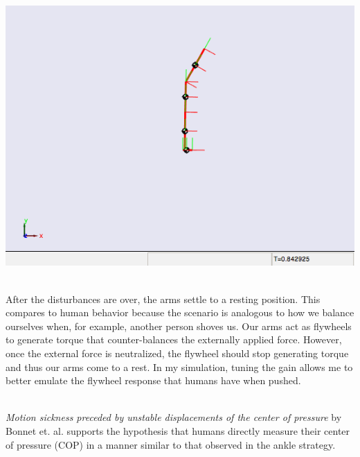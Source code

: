 \documentclass{article}
\newcommand{\questionhead}[1]
  {\bigskip\bigskip
   \noindent{\LARGE\bf Question #1}
   \bigskip}
\begin{document}
\begin{center}
\includegraphics[scale=0.75]{1c_flywheel.png}
\end{center}


\\

After the disturbances are over, the arms settle to a resting position. This compares to human behavior because the scenario is analogous to how we balance ourselves when, for example, another person shoves us. Our arms act as flywheels to generate torque that counter-balances the externally applied force. However, once the external force is neutralized, the flywheel should stop generating torque and thus our arms come to a rest. In my simulation, tuning the gain allows me to better emulate the flywheel response that humans have when pushed. 




\questionhead{2}

\\
 
\emph{Motion sickness preceded by unstable displacements of the center of pressure} by Bonnet et. al. supports the hypothesis that humans directly measure their center of pressure (COP) in a manner similar to that observed in the ankle strategy.
\end{document}
